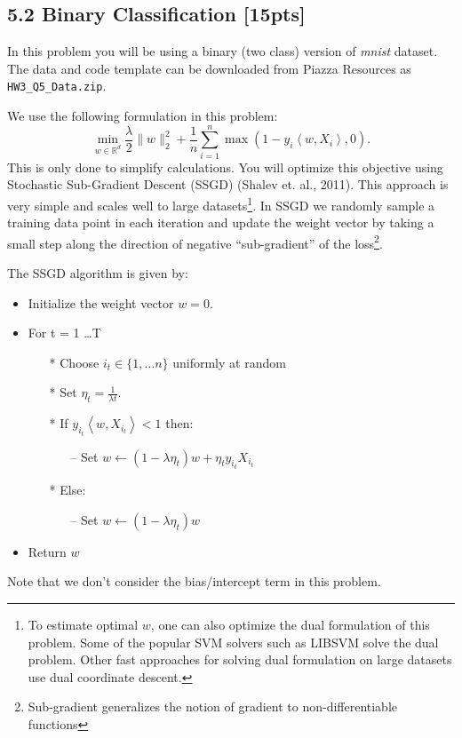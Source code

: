 \begin{soln}
\end{soln}



\subsection*{5.2 Binary Classification [15pts]}
In this problem you will be using a binary (two class) version of \emph{mnist} dataset. The data and code template can be downloaded from Piazza Resources as \texttt{HW3\_Q5\_Data.zip}.

We use the following formulation in this problem:
\[
\min_{w\in \mathbb{R}^d}   \frac{\lambda}{2} \|w\|^2_2 + \frac{1}{n}\sum_{i = 1}^n \max(1 - y_i\left\langle w, X_i\right\rangle, 0).
\]
This is only done to simplify calculations. You will optimize this objective using Stochastic Sub-Gradient Descent (SSGD) (Shalev et. al., 2011). This approach is very simple and scales well to large datasets\footnote{To estimate optimal $w$, one can also optimize the dual formulation of this problem. Some of the popular SVM solvers such as LIBSVM solve the dual problem. Other fast approaches for solving dual formulation on large datasets use dual coordinate descent.}. In SSGD we randomly sample a training data point in each iteration and update the weight vector by taking a small step along the direction of negative ``sub-gradient'' of the loss\footnote{Sub-gradient generalizes the notion of gradient to non-differentiable  functions}. \pagebreak

The SSGD algorithm is given by:
\begin{itemize}
\item Initialize the weight vector $w = 0$.
\item For t = 1 \dots T 
\begin{itemize}
\item[*] Choose $i_t \in \{1, \dots n\}$ uniformly at random
\item[*] Set $\eta_t = \frac{1}{\lambda t}$.
\item[*] If $y_{i_t}\left\langle w, X_{i_t}\right\rangle < 1$ then:
\begin{itemize}
\item[--] Set $w \leftarrow (1- \lambda\eta_t)w + \eta_ty_{i_t}X_{i_t}$
\end{itemize}
\item[*] Else:
\begin{itemize}
\item[--] Set $w \leftarrow (1- \lambda\eta_t)w$
\end{itemize}
\end{itemize}
\item Return $w$
\end{itemize}
Note that we don't consider the bias/intercept term in this problem. 

